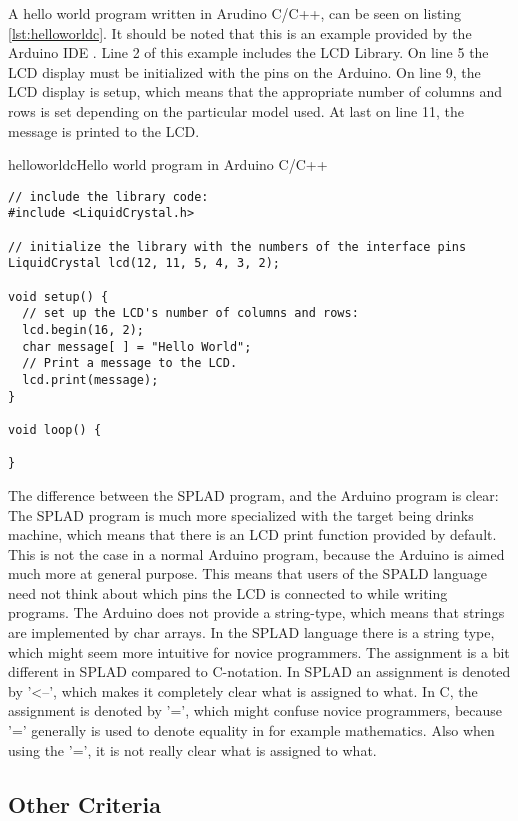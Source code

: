 A hello world program written in Arudino C/C++, can be seen on listing \ref{lst:helloworldc}. It should be noted that this is an example provided by the Arduino IDE \citep{LCDtut}. Line 2 of this example includes the LCD Library. On line 5 the LCD display must be initialized with the pins on the Arduino. On line 9, the LCD display is setup, which means that the appropriate number of columns and rows is set depending on the particular model used. At last on line 11, the message is printed to the LCD.
 
\begin{code}{helloworldc}{Hello world program in Arduino C/C++}
\begin{lstlisting}
// include the library code:
#include <LiquidCrystal.h>

// initialize the library with the numbers of the interface pins
LiquidCrystal lcd(12, 11, 5, 4, 3, 2);

void setup() {
  // set up the LCD's number of columns and rows: 
  lcd.begin(16, 2);
  char message[ ] = "Hello World";
  // Print a message to the LCD.
  lcd.print(message);
}

void loop() {

}
\end{lstlisting}
\end{code}
The difference between the SPLAD program, and the Arduino program is clear: The SPLAD program is much more specialized with the target being drinks machine, which means that there is an LCD print function provided by default. This is not the case in a normal Arduino program, because the Arduino is aimed much more at general purpose. This means that users of the SPALD language need not think about which pins the LCD is connected to while writing programs. The Arduino does not provide a string-type, which means that strings are implemented by char arrays. In the SPLAD language there is a string type, which might seem more intuitive for novice programmers. The assignment is a bit different in SPLAD compared to C-notation. In SPLAD an assignment is denoted by '<--', which makes it completely clear what is assigned to what. In C, the assignment is denoted by '=', which might confuse novice programmers, because '=' generally is used to denote equality in for example mathematics. Also when using the '=', it is not really clear what is assigned to what.

\subsection{Other Criteria}


